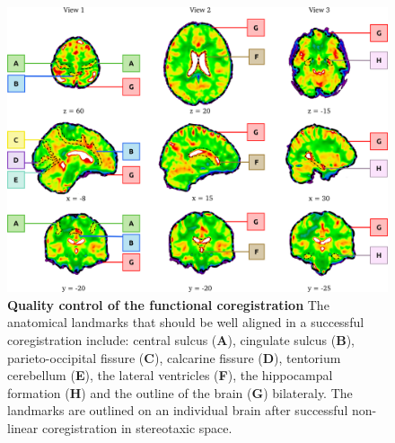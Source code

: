 \documentclass[12pt]{paper}%
\begin{document}
\begin{figure}[htbp]
\begin{center}
\includegraphics[width=\linewidth]{fig_qc_func}
\end{center}
\caption{
{\textbf{Quality control of the functional coregistration}} {The anatomical landmarks that should be well aligned in a successful coregistration include: central sulcus (\textbf{A}), cingulate sulcus (\textbf{B}), parieto-occipital fissure (\textbf{C}), calcarine fissure (\textbf{D}), tentorium cerebellum (\textbf{E}), the lateral ventricles (\textbf{F}), the hippocampal formation (\textbf{H}) and the outline of the brain (\textbf{G}) bilateraly. The landmarks are outlined on an individual brain after successful non-linear coregistration in stereotaxic space.}
}
\label{fig_qc_func}
\end{figure}


\newpage
\end{document}
